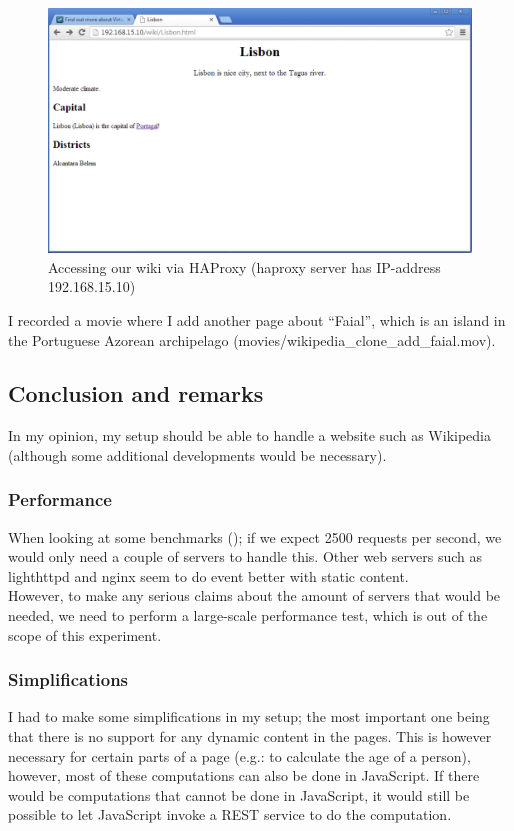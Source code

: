 \documentclass[12pt]{report}
\begin{document}
\begin{figure}[h!]
  \caption{Accessing our wiki via HAProxy (haproxy server has
    IP-address 192.168.15.10)}
  \label{fig:wikipedia_clone_1}
  \centering
    \includegraphics[scale=0.2]{pics/wikipedia_clone_1.png}
\end{figure}

I recorded a movie where I add another page about ``Faial'', which is
an island in the Portuguese Azorean archipelago
(movies/wikipedia\_clone\_add\_faial.mov).

\subsection{Conclusion and remarks}
In my opinion, my setup should be able to handle a website such as
Wikipedia (although some additional developments would be
necessary). 
\subsubsection{Performance}
When looking at some benchmarks
(\cite{web_server_benchmarks}); if we expect 2500 requests per second,
we would only need a couple of servers to handle this. Other web
servers such as lighthttpd and nginx seem to do event better with
static content. \\
However, to make any serious claims about the amount of servers that
would be needed, we need to perform a large-scale performance test,
which is out of the scope of this experiment.
\subsubsection{Simplifications}
I had to make some simplifications in my setup; the most important one
being that there is no support for any dynamic content in the pages. This
is however necessary for certain parts of a page (e.g.: to
calculate the age of a person), however, most of these computations
can also be done in JavaScript. If there would be computations that
cannot be done in JavaScript, it would still be possible to let
JavaScript invoke a REST service to do the computation.   
\end{document}
